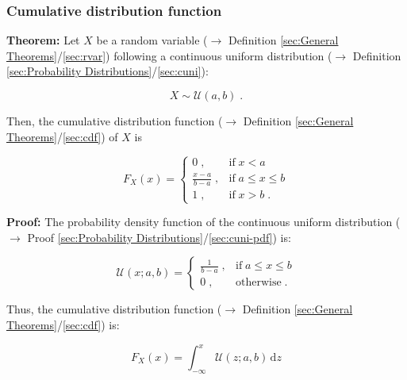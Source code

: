 \documentclass[a4paper,12pt,twoside]{book}
\begin{document}
\subsubsection[\textbf{Cumulative distribution function}]{Cumulative distribution function} \label{sec:cuni-cdf}
\setcounter{equation}{0}

\textbf{Theorem:} Let $X$ be a random variable ($\rightarrow$ Definition \ref{sec:General Theorems}/\ref{sec:rvar}) following a continuous uniform distribution ($\rightarrow$ Definition \ref{sec:Probability Distributions}/\ref{sec:cuni}):

\begin{equation} \label{eq:cuni-cdf-cuni}
X \sim \mathcal{U}(a, b) \; .
\end{equation}

Then, the cumulative distribution function ($\rightarrow$ Definition \ref{sec:General Theorems}/\ref{sec:cdf}) of $X$ is

\begin{equation} \label{eq:cuni-cdf-cuni-cdf}
F_X(x) = \left\{
\begin{array}{rl}
0 \; , & \text{if} \; x < a \\
\frac{x-a}{b-a} \; , & \text{if} \; a \leq x \leq b \\
1 \; , & \text{if} \; x > b \; .
\end{array}
\right.
\end{equation}


\vspace{1em}
\textbf{Proof:} The probability density function of the continuous uniform distribution ($\rightarrow$ Proof \ref{sec:Probability Distributions}/\ref{sec:cuni-pdf}) is:

\begin{equation} \label{eq:cuni-cdf-cuni-pdf}
\mathcal{U}(x; a, b) = \left\{
\begin{array}{rl}
\frac{1}{b-a} \; , & \text{if} \; a \leq x \leq b \\
0 \; , & \text{otherwise} \; .
\end{array}
\right.
\end{equation}

Thus, the cumulative distribution function ($\rightarrow$ Definition \ref{sec:General Theorems}/\ref{sec:cdf}) is:

\begin{equation} \label{eq:cuni-cdf-cuni-cdf-s1}
F_X(x) = \int_{-\infty}^{x} \mathcal{U}(z; a, b) \, \mathrm{d}z
\end{equation}
\end{document}
